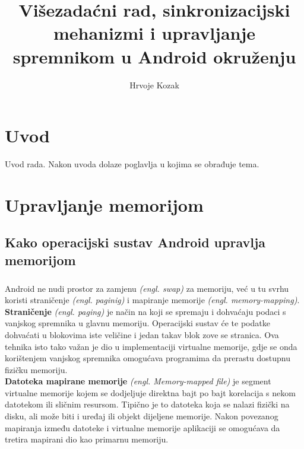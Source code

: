 \documentclass[times, utf8, zavrsni]{fer}
\begin{document}

\title{Višezadaćni rad, sinkronizacijski mehanizmi i upravljanje spremnikom u Android okruženju}

\author{Hrvoje Kozak}

\maketitle


\zahvala{}

\tableofcontents

\chapter{Uvod}
Uvod rada. Nakon uvoda dolaze poglavlja u kojima se obrađuje tema.

\chapter{Upravljanje memorijom}
\section{Kako operacijski sustav Android upravlja memorijom}
\paragraph{}
Android ne nudi prostor za zamjenu \textit{(engl. swap)} za memoriju, već u tu svrhu koristi straničenje \textit{(engl. paginig)} i mapiranje memorije \textit{(engl. memory-mapping)}.\\

\textbf{Straničenje} \textit{(engl. paging)} je način na koji se spremaju i dohvaćaju podaci s vanjskog spremnika u glavnu memoriju. Operacijski sustav će te podatke dohvaćati u blokovima iste veličine i jedan takav blok zove se stranica. Ova tehnika isto tako važan je dio u implementaciji virtualne memorije, gdje se onda korištenjem vanjskog spremnika omogućava programima da prerastu dostupnu fizičku memoriju.\\

\textbf{Datoteka mapirane memorije} \textit{(engl. Memory-mapped file)} je segment virtualne memorije kojem se dodjeljuje direktna bajt po bajt korelacija s nekom datotekom ili sličnim resursom. Tipično je to datoteka koja se nalazi fizički na disku, ali može biti i uređaj ili objekt dijeljene memorije. Nakon povezanog mapiranja između datoteke i virtualne memorije aplikaciji se omogućava da tretira mapirani dio kao primarnu memoriju.\\
\end{document}
